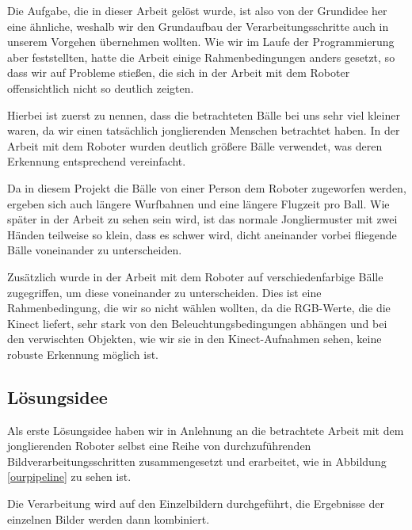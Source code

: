 \documentclass[12pt,a4paper,ngerman]{scrartcl}
\begin{document}
Die Aufgabe, die in dieser Arbeit gelöst wurde, ist also von der Grundidee her eine
ähnliche, weshalb wir den Grundaufbau der Verarbeitungsschritte auch in unserem
Vorgehen übernehmen wollten. Wie wir im Laufe der Programmierung aber feststellten,
hatte die Arbeit einige Rahmenbedingungen anders gesetzt, so dass wir auf Probleme
stießen, die sich in der Arbeit mit dem Roboter offensichtlich nicht so deutlich
zeigten.

Hierbei ist zuerst zu nennen, dass die betrachteten Bälle bei uns sehr viel kleiner
waren, da wir einen tatsächlich jonglierenden Menschen betrachtet haben. In der
Arbeit mit dem Roboter wurden deutlich größere Bälle verwendet, was deren Erkennung
entsprechend vereinfacht.

Da in diesem Projekt die Bälle von einer Person dem Roboter zugeworfen werden,
ergeben sich auch längere Wurfbahnen und eine längere Flugzeit pro Ball. Wie
später in der Arbeit zu sehen sein wird, ist das normale Jongliermuster mit zwei
Händen teilweise so klein, dass es schwer wird, dicht aneinander vorbei fliegende
Bälle voneinander zu unterscheiden.

Zusätzlich wurde in der Arbeit mit dem Roboter auf verschiedenfarbige Bälle
zugegriffen, um diese voneinander zu unterscheiden. Dies ist eine Rahmenbedingung,
die wir so nicht wählen wollten, da die RGB-Werte, die die Kinect liefert, sehr stark
von den Beleuchtungsbedingungen abhängen und bei den verwischten Objekten, wie
wir sie in den Kinect-Aufnahmen sehen, keine robuste Erkennung möglich ist.


\subsection{Lösungsidee}

Als erste Lösungsidee haben wir in Anlehnung an die betrachtete Arbeit mit dem
jonglierenden Roboter selbst eine Reihe von durchzuführenden Bildverarbeitungsschritten
zusammengesetzt und erarbeitet, wie in Abbildung \ref{ourpipeline} zu sehen ist.

Die Verarbeitung wird auf den Einzelbildern durchgeführt, die Ergebnisse der
einzelnen Bilder werden dann kombiniert.
\end{document}
